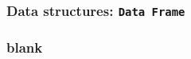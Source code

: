 \documentclass[ucs]{beamer}
\begin{document}
  \begin{frame}
    \frametitle{Data structures: \texttt{Data Frame}}
  \end{frame}


  
  \begin{frame}
    \frametitle{blank}
    \begin{columns}[T]
      \begin{column}{0.5\textwidth}
      \end{column}
     \begin{column}{0.5\textwidth}
      \end{column}
    \end{columns}
  \end{frame}
  
  
\end{document}
